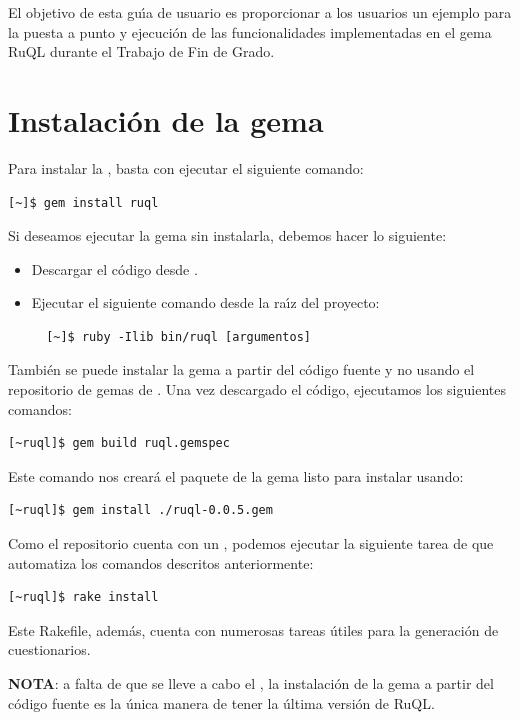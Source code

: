 El objetivo de esta gu\'{\i}a de usuario es proporcionar a los usuarios un ejemplo para la puesta a punto y ejecuci\'on de las 
funcionalidades implementadas en el gema RuQL durante el Trabajo de Fin de Grado.

\section{Instalaci\'on de la gema}
\label{Apendice2:instalacion}

Para instalar la , basta con ejecutar el siguiente comando:
\begin{verbatim}
[~]$ gem install ruql
\end{verbatim}

Si deseamos ejecutar la gema sin instalarla, debemos hacer lo siguiente:
\begin{itemize}
  \item Descargar el c\'odigo desde \href{https://github.com/jjlabrador/ruql}{}.
  \item Ejecutar el siguiente comando desde la ra\'{\i}z del proyecto:
  \begin{verbatim}
  [~]$ ruby -Ilib bin/ruql [argumentos]
  \end{verbatim}
\end{itemize}

Tambi\'en se puede instalar la gema a partir del c\'odigo fuente y no usando el repositorio de gemas de . Una vez descargado el c\'odigo, ejecutamos los siguientes
comandos:
\begin{verbatim}
[~ruql]$ gem build ruql.gemspec
\end{verbatim}
Este comando nos crear\'a el paquete de la gema listo para instalar usando:
\begin{verbatim}
[~ruql]$ gem install ./ruql-0.0.5.gem
\end{verbatim}
\newpage

Como el repositorio cuenta con un , podemos ejecutar la siguiente tarea de  que automatiza los comandos descritos anteriormente:
\begin{verbatim}
[~ruql]$ rake install
\end{verbatim}

Este Rakefile, adem\'as, cuenta con numerosas tareas \'utiles para la generaci\'on de cuestionarios.
\bigskip

{\bfseries NOTA}: a falta de que se lleve a cabo el , la instalaci\'on de la gema a partir del c\'odigo fuente es la \'unica manera de tener la \'ultima versi\'on
de RuQL.
\bigskip

